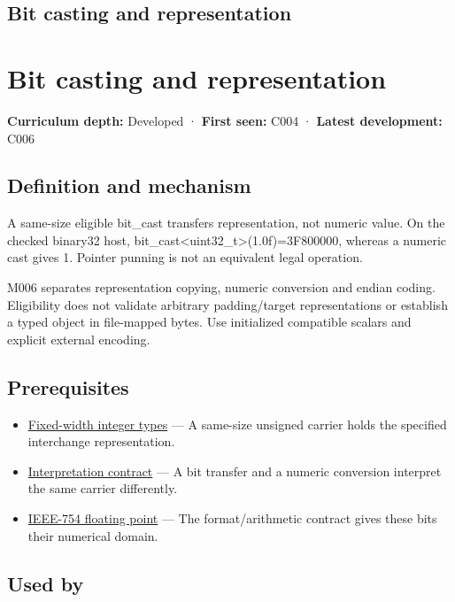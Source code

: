 \hypertarget{appendix-34ee45f161c1}{}
\section*{Bit casting and representation}
\chapter{Bit casting and representation}\label{appendix-34ee45f161c1-bit-casting-and-representation}

\textbf{Curriculum depth:} Developed · \textbf{First seen:} C004 · \textbf{Latest development:} C006

\section{Definition and mechanism}\label{appendix-34ee45f161c1-definition-and-mechanism}

A same-size eligible bit\_cast transfers representation, not numeric value. On the checked binary32 host, bit\_cast\textless uint32\_t\textgreater{}(1.0f)=3F800000, whereas a numeric cast gives 1. Pointer punning is not an equivalent legal operation.

M006 separates representation copying, numeric conversion and endian coding. Eligibility does not validate arbitrary padding/target representations or establish a typed object in file-mapped bytes. Use initialized compatible scalars and explicit external encoding.

\section{Prerequisites}\label{appendix-34ee45f161c1-prerequisites}

\begin{itemize}
\tightlist
\item
  \hyperref[appendix-cc04044b5782]{Fixed-width integer types} --- A same-size unsigned carrier holds the specified interchange representation.
\item
  \hyperref[appendix-f414bd4ed05c]{Interpretation contract} --- A bit transfer and a numeric conversion interpret the same carrier differently.
\item
  \hyperref[appendix-343615f49ddf]{IEEE-754 floating point} --- The format/arithmetic contract gives these bits their numerical domain.
\end{itemize}

\section{Used by}\label{appendix-34ee45f161c1-used-by}

